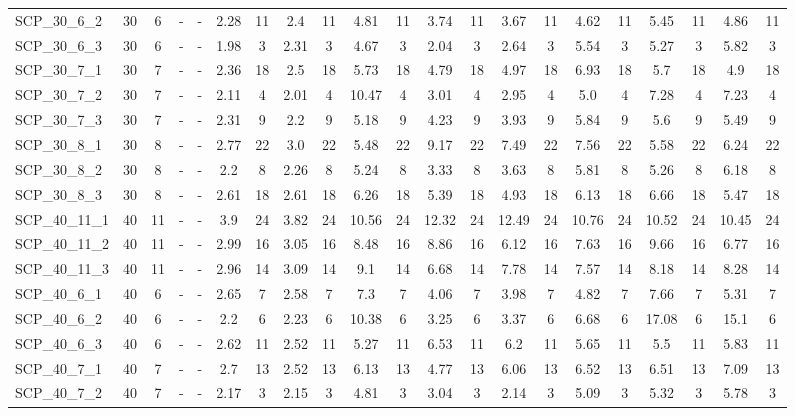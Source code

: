 \begin{sidewaystable}[!ht]
{\begin{tabular}{lcccccccccccccccccccc}
SCP\_30\_6\_2 & 30 & 6 &  - &  - & 2.28 & 11 & 2.4 & 11 & 4.81 & 11 & 3.74 & 11 & 3.67 & 11 & 4.62 & 11 & 5.45 & 11 & 4.86 & 11 \\
SCP\_30\_6\_3 & 30 & 6 &  - &  - & 1.98 & 3 & 2.31 & 3 & 4.67 & 3 & 2.04 & 3 & 2.64 & 3 & 5.54 & 3 & 5.27 & 3 & 5.82 & 3 \\
SCP\_30\_7\_1 & 30 & 7 &  - &  - & 2.36 & 18 & 2.5 & 18 & 5.73 & 18 & 4.79 & 18 & 4.97 & 18 & 6.93 & 18 & 5.7 & 18 & 4.9 & 18 \\
SCP\_30\_7\_2 & 30 & 7 &  - &  - & 2.11 & 4 & 2.01 & 4 & 10.47 & 4 & 3.01 & 4 & 2.95 & 4 & 5.0 & 4 & 7.28 & 4 & 7.23 & 4 \\
SCP\_30\_7\_3 & 30 & 7 &  - &  - & 2.31 & 9 & 2.2 & 9 & 5.18 & 9 & 4.23 & 9 & 3.93 & 9 & 5.84 & 9 & 5.6 & 9 & 5.49 & 9 \\
SCP\_30\_8\_1 & 30 & 8 &  - &  - & 2.77 & 22 & 3.0 & 22 & 5.48 & 22 & 9.17 & 22 & 7.49 & 22 & 7.56 & 22 & 5.58 & 22 & 6.24 & 22 \\
SCP\_30\_8\_2 & 30 & 8 &  - &  - & 2.2 & 8 & 2.26 & 8 & 5.24 & 8 & 3.33 & 8 & 3.63 & 8 & 5.81 & 8 & 5.26 & 8 & 6.18 & 8 \\
SCP\_30\_8\_3 & 30 & 8 &  - &  - & 2.61 & 18 & 2.61 & 18 & 6.26 & 18 & 5.39 & 18 & 4.93 & 18 & 6.13 & 18 & 6.66 & 18 & 5.47 & 18 \\
SCP\_40\_11\_1 & 40 & 11 &  - &  - & 3.9 & 24 & 3.82 & 24 & 10.56 & 24 & 12.32 & 24 & 12.49 & 24 & 10.76 & 24 & 10.52 & 24 & 10.45 & 24 \\
SCP\_40\_11\_2 & 40 & 11 &  - &  - & 2.99 & 16 & 3.05 & 16 & 8.48 & 16 & 8.86 & 16 & 6.12 & 16 & 7.63 & 16 & 9.66 & 16 & 6.77 & 16 \\
SCP\_40\_11\_3 & 40 & 11 &  - &  - & 2.96 & 14 & 3.09 & 14 & 9.1 & 14 & 6.68 & 14 & 7.78 & 14 & 7.57 & 14 & 8.18 & 14 & 8.28 & 14 \\
SCP\_40\_6\_1 & 40 & 6 &  - &  - & 2.65 & 7 & 2.58 & 7 & 7.3 & 7 & 4.06 & 7 & 3.98 & 7 & 4.82 & 7 & 7.66 & 7 & 5.31 & 7 \\
SCP\_40\_6\_2 & 40 & 6 &  - &  - & 2.2 & 6 & 2.23 & 6 & 10.38 & 6 & 3.25 & 6 & 3.37 & 6 & 6.68 & 6 & 17.08 & 6 & 15.1 & 6 \\
SCP\_40\_6\_3 & 40 & 6 &  - &  - & 2.62 & 11 & 2.52 & 11 & 5.27 & 11 & 6.53 & 11 & 6.2 & 11 & 5.65 & 11 & 5.5 & 11 & 5.83 & 11 \\
SCP\_40\_7\_1 & 40 & 7 &  - &  - & 2.7 & 13 & 2.52 & 13 & 6.13 & 13 & 4.77 & 13 & 6.06 & 13 & 6.52 & 13 & 6.51 & 13 & 7.09 & 13 \\
SCP\_40\_7\_2 & 40 & 7 &  - &  - & 2.17 & 3 & 2.15 & 3 & 4.81 & 3 & 3.04 & 3 & 2.14 & 3 & 5.09 & 3 & 5.32 & 3 & 5.78 & 3 \\

\end{tabular}}
\end{sidewaystable}
